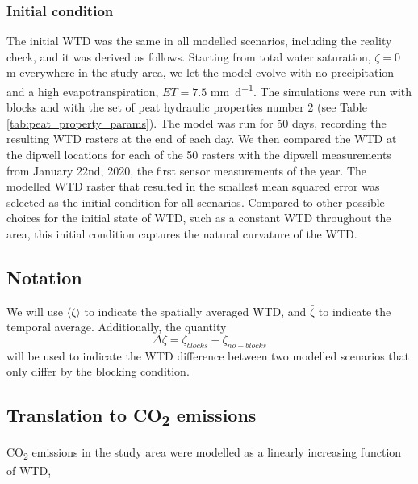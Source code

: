 \documentclass[bg, manuscript]{copernicus}
\begin{document}
\subsubsection{Initial condition} \label{sec:initial-condition}
The initial WTD was the same in all modelled scenarios, including the reality check, and it was derived as follows.
Starting from total water saturation, $\zeta=0$ \unit{m} everywhere in the study area, we let the model evolve with no precipitation and a high evapotranspiration, $ET=7.5$ \unit{mm d^{-1}}.
The simulations were run with blocks and with the set of peat hydraulic properties number 2 (see Table \ref{tab:peat_property_params}).
The model was run for 50 days, recording the resulting WTD rasters at the end of each day.
We then compared the WTD  at the dipwell locations for each of the 50 rasters with the dipwell measurements from January 22nd, 2020, the first sensor measurements of the year.
The modelled WTD raster that resulted in the smallest mean squared error was selected as the initial condition for all scenarios.
Compared to other possible choices for the initial state of WTD, such as a constant WTD throughout the area, this initial condition captures the natural curvature of the WTD.


\subsection{Notation}

We will use $\langle \zeta \rangle$ to indicate the spatially averaged WTD, and $\bar{\zeta}$ to indicate the temporal average.
Additionally, the quantity 
\begin{equation} \label{eq:def_delta_zeta}
\Delta \zeta =  \zeta_{blocks} - \zeta_{no-blocks}
\end{equation}
will be used to indicate the WTD difference between two modelled scenarios that only differ by the blocking condition.

\subsection{Translation to CO\textsubscript{2} emissions}

CO\textsubscript{2} emissions in the study area were modelled as a linearly increasing function of WTD,
\end{document}
